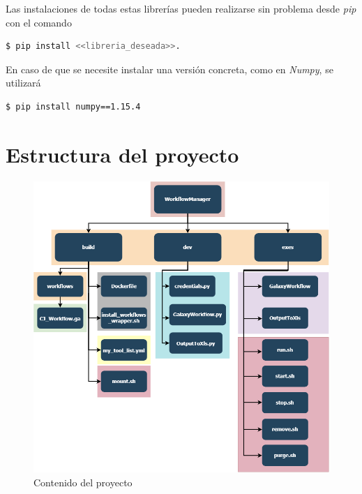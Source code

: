         Las instalaciones de todas estas librerías pueden realizarse sin problema desde \textit{pip} con el comando
        \begin{lstlisting}[language=bash]
        $ pip install <<libreria_deseada>>.
        \end{lstlisting} 
        En caso de que se necesite instalar una versión concreta, como en \textit{Numpy}, se utilizará
        \begin{lstlisting}[language=bash]
        $ pip install numpy==1.15.4
        \end{lstlisting} 

\section{Estructura del proyecto}
\begin{figure}
    \begin{center}
      \includegraphics[scale=0.4]{images/FolderStructure.png}
      \caption{Contenido del proyecto}
      \label{fig:ContenidoDelProyecto}
    \end{center}
\end{figure}

